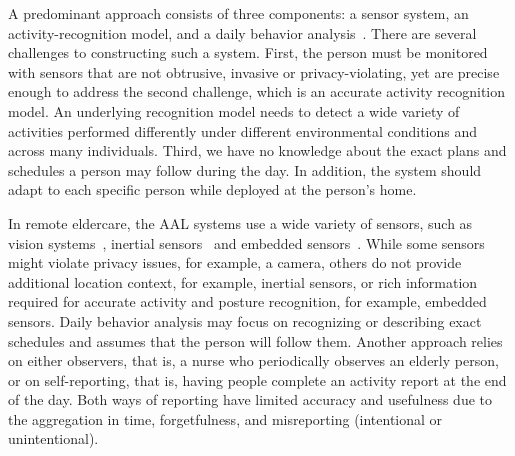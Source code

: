 %
%
A predominant approach consists of three components: a sensor system, an activity-recognition model, and a daily behavior analysis~\citep{Choudhury06towards}. There are several challenges to constructing such a system. First, the person must be monitored with sensors that are not obtrusive, invasive or privacy-violating, yet are precise enough to address the second challenge, which is an accurate activity recognition model. An underlying recognition model needs to detect a wide variety of activities performed differently under different environmental conditions and across many individuals. Third, we have no knowledge about the exact plans and schedules a person may follow during the day. In addition, the system should adapt to each specific person while deployed at the person's home.

%
%
%
%
In remote eldercare, the AAL systems use a wide variety of sensors, such as vision systems~\citep{Fabien}, inertial sensors~\citep{Bourke} and embedded sensors~\citep{Lymberopoulos, Monekosso}. While some sensors might violate privacy issues, for example, a camera, others do not provide additional location context, for example, inertial sensors, or rich information required for accurate activity and posture recognition, for example, embedded sensors. Daily behavior analysis may focus on recognizing or describing exact schedules and assumes that the person will follow them. Another approach relies on either observers, that is, a nurse who periodically observes an elderly person, or on self-reporting, that is, having people complete an activity report at the end of the day. Both ways of reporting have limited accuracy and usefulness due to the aggregation in time, forgetfulness, and misreporting (intentional or unintentional). 

